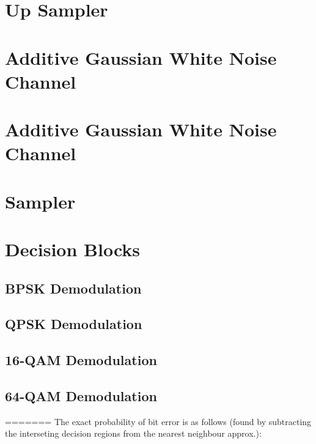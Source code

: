 \documentclass[]{article}
\begin{document}
\section{Up Sampler}
\label{app:impulse_train}

\cleardoublepage
\newpage

\section{Additive Gaussian White Noise Channel}
\label{app:awgn_channel}

\cleardoublepage
\newpage

\section{Additive Gaussian White Noise Channel}
\label{app:awgn_channel}

\cleardoublepage
\newpage

\section{Sampler}
\label{app:sampler}

\cleardoublepage
\newpage

\section{Decision Blocks}
\label{app:dblocks}
\subsection{BPSK Demodulation}
\label{app:bpsk_demod}

\cleardoublepage
\newpage

\subsection{QPSK Demodulation}
\label{app:qpsk_demod}

\cleardoublepage
\newpage

\subsection{16-QAM Demodulation}
\label{app:qam_16_demod}

\cleardoublepage
\newpage

\subsection{64-QAM Demodulation}
\label{app:qam_64_demod}

\cleardoublepage
\newpage
=======
The exact probability of bit error is as follows (found by subtracting the interseting decision regions from the nearest neighbour approx.):
\end{document}
